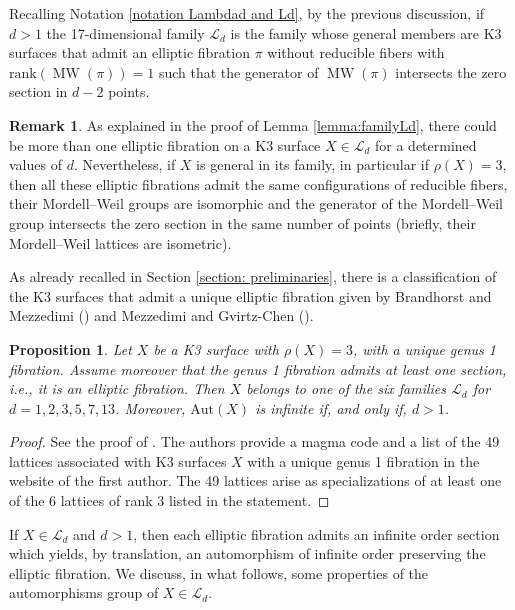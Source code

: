\documentclass{amsart}
\newtheorem{proposition}[theorem]{Proposition}
\theoremstyle{definition}
\newtheorem{remark}[theorem]{Remark}
\numberwithin{equation}{section}
\newcommand{\rk}{\mbox{rank}}
\DeclareMathOperator{\MW}{MW}
\begin{document}
Recalling Notation \ref{notation Lambdad and Ld}, by the previous discussion, if $d>1$ the 17-dimensional family $\mathcal{L}_d$ is the family whose general members are K3 surfaces that admit an elliptic fibration $\pi$ without reducible fibers with $\rk(\MW(\pi))=1$  such that the generator of $\MW(\pi)$ intersects the zero section in $d-2$ points. 

\begin{remark}\label{rmk:one type of elliptic fibration}
As explained in the proof of Lemma \ref{lemma:familyLd}, there could be more than one elliptic fibration on a K3 surface $X\in\mathcal{L}_d$ for a determined values of $d$. Nevertheless, if $X$ is general in its family, in particular if $\rho(X)=3$, then all these elliptic fibrations admit the same configurations of reducible fibers, their Mordell--Weil groups are isomorphic and the generator of the Mordell--Weil group intersects the zero section in the same number of points (briefly, their Mordell--Weil lattices are isometric). 
\end{remark}

As already recalled in Section \ref{section: preliminaries}, there is a classification of the K3 surfaces that admit a unique elliptic fibration given by Brandhorst and Mezzedimi (\cite{BM}) and Mezzedimi and Gvirtz-Chen (\cite{GM}).

\begin{proposition}\label{prop: unique elliptic fibration}
Let $X$ be a K3 surface with $\rho(X)=3$, with a unique genus 1 fibration. Assume moreover that the genus 1 fibration admits at least one section, i.e., it is an elliptic fibration. Then $X$ belongs to one of the six families $\mathcal{L}_d$ for $d=1,2,3,5,7,13$. Moreover, $\mathrm{Aut}(X)$ is infinite if, and only if, $d>1$.
\end{proposition}
\begin{proof}
See the proof of \cite[Theorem 4.5]{GM}. The authors provide a magma code and a list of the 49 lattices associated with K3 surfaces $X$ with a unique genus 1 fibration in the website of the first author. The 49 lattices arise as specializations of at least one of the 6 lattices of rank 3 listed in the statement.
\end{proof}

If $X\in\mathcal{L}_d$ and $d>1$, then each elliptic fibration admits an infinite order section which yields, by translation, an automorphism of infinite order preserving the elliptic fibration. We discuss, in what follows, some properties of the automorphisms group of $X\in\mathcal{L}_d$.
\end{document}
